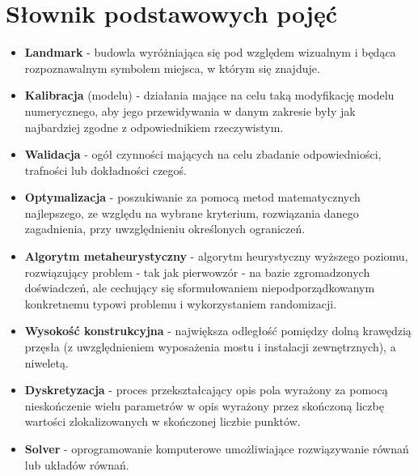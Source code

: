 \section*{Słownik podstawowych pojęć}
\begin{itemize}[label = {},leftmargin=0pt]
\item \textbf{Landmark} - budowla wyróżniająca się pod względem wizualnym i będąca rozpoznawalnym symbolem miejsca, w którym się znajduje.
\item \textbf{Kalibracja} (modelu) - działania mające na celu taką modyfikację modelu numerycznego, aby jego przewidywania w danym zakresie były jak najbardziej zgodne z odpowiednikiem rzeczywistym.
\item \textbf{Walidacja} - ogół czynności mających na celu zbadanie odpowiedniości, trafności lub dokładności czegoś.
\item \textbf{Optymalizacja} - poszukiwanie za pomocą metod matematycznych najlepszego, ze względu na wybrane kryterium, rozwiązania danego zagadnienia, przy uwzględnieniu określonych ograniczeń.
\item \textbf{Algorytm metaheurystyczny} - algorytm heurystyczny wyższego poziomu, rozwiązujący problem - tak jak pierwowzór - na bazie zgromadzonych doświadczeń, ale cechujący się sformułowaniem niepodporządkowanym konkretnemu typowi problemu i wykorzystaniem randomizacji. 
\item \textbf{Wysokość konstrukcyjna} - największa odległość pomiędzy dolną krawędzią przęsła (z uwzględnieniem wyposażenia mostu i instalacji zewnętrznych), a niweletą.
\item \textbf{Dyskretyzacja} - proces przekształcający opis pola wyrażony za pomocą nieskończenie wielu parametrów w opis wyrażony przez skończoną liczbę wartości zlokalizowanych w skończonej liczbie punktów.
\item \textbf{Solver} - oprogramowanie komputerowe umożliwiające rozwiązywanie równań lub układów równań.
\end{itemize}